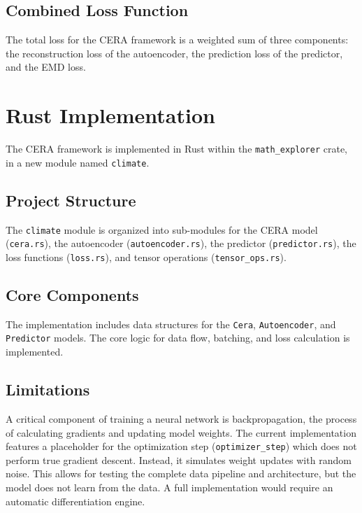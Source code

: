 \documentclass{article}
\begin{document}
\subsection{Combined Loss Function}
The total loss for the CERA framework is a weighted sum of three components: the reconstruction loss of the autoencoder, the prediction loss of the predictor, and the EMD loss.

\section{Rust Implementation}
The CERA framework is implemented in Rust within the \texttt{math\_explorer} crate, in a new module named \texttt{climate}.

\subsection{Project Structure}
The \texttt{climate} module is organized into sub-modules for the CERA model (\texttt{cera.rs}), the autoencoder (\texttt{autoencoder.rs}), the predictor (\texttt{predictor.rs}), the loss functions (\texttt{loss.rs}), and tensor operations (\texttt{tensor\_ops.rs}).

\subsection{Core Components}
The implementation includes data structures for the \texttt{Cera}, \texttt{Autoencoder}, and \texttt{Predictor} models. The core logic for data flow, batching, and loss calculation is implemented.

\subsection{Limitations}
A critical component of training a neural network is backpropagation, the process of calculating gradients and updating model weights. The current implementation features a placeholder for the optimization step (\texttt{optimizer\_step}) which does not perform true gradient descent. Instead, it simulates weight updates with random noise. This allows for testing the complete data pipeline and architecture, but the model does not learn from the data. A full implementation would require an automatic differentiation engine.
\end{document}
